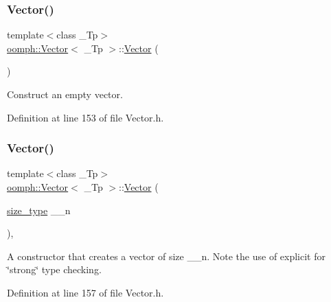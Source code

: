 \subsubsection{\texorpdfstring{Vector()}{Vector()}\hspace{0.1cm}{\footnotesize\ttfamily [1/4]}}
{\footnotesize\ttfamily template$<$class \+\_\+\+Tp$>$ \\
\hyperlink{classoomph_1_1Vector}{oomph\+::\+Vector}$<$ \+\_\+\+Tp $>$\+::\hyperlink{classoomph_1_1Vector}{Vector} (\begin{DoxyParamCaption}{ }\end{DoxyParamCaption})\hspace{0.3cm}{\ttfamily [inline]}}



Construct an empty vector. 



Definition at line 153 of file Vector.\+h.

\mbox{\label{classoomph_1_1Vector_a996ae9557e2ee9491771eb586e032994}} 
\subsubsection{\texorpdfstring{Vector()}{Vector()}\hspace{0.1cm}{\footnotesize\ttfamily [2/4]}}
{\footnotesize\ttfamily template$<$class \+\_\+\+Tp$>$ \\
\hyperlink{classoomph_1_1Vector}{oomph\+::\+Vector}$<$ \+\_\+\+Tp $>$\+::\hyperlink{classoomph_1_1Vector}{Vector} (\begin{DoxyParamCaption}\item[{\hyperlink{classoomph_1_1Vector_a8ad2a43bd51f6bf2a981dd4e4e4247f5}{size\+\_\+type}}]{\+\_\+\+\_\+n }\end{DoxyParamCaption})\hspace{0.3cm}{\ttfamily [inline]}, {\ttfamily [explicit]}}



A constructor that creates a vector of size \+\_\+\+\_\+n. Note the use of explicit for \char`\"{}strong\char`\"{} type checking. 



Definition at line 157 of file Vector.\+h.

\mbox{\label{classoomph_1_1Vector_a408f09400832e1584c832aff24b00966}} 
